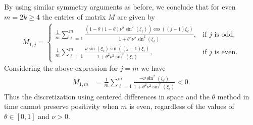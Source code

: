\documentclass[a4paper]{article}
\begin{document}
\begin{description}[style=unboxed,leftmargin=0cm]
\item [{Case 1:} $m$ is {even}.]
\item \noindent By using similar symmetry arguments as before, we conclude that for {even} $m=2k\ge 4$
the entries of matrix $M$ are given by
\begin{align*}
	M_{1,j} = \begin{cases}
				\displaystyle
				\frac{1}{m} \sum_{\ell=1}^{m}\frac{\left(1-\theta(1-\theta)\nu^2\sin^2(\xi_\ell)
					\right)\cos((j-1)\xi_\ell)}{1+\theta^2\nu^2\sin^2(\xi_\ell)}, &\mbox{if } j
					\text{ is odd}, \\[20pt]
				\displaystyle
				\frac{1}{m} \sum_{\ell=1}^{m} \frac{\nu \sin(\xi_\ell)\sin((j-1)\xi_\ell)}
					{1+\theta^2\nu^2 \sin^2 (\xi_\ell)}, &\mbox{if } j \text{ is even}.
			  \end{cases}
\end{align*}
Considering  the above expression for $j = m$ we have
\begin{align*}
    M_{1,m} & =  \frac{1}{m} \sum_{\ell=1}^{m} \frac{- \nu \sin^2 (\xi_\ell)}{1+\theta^2\nu^2 \sin^2 (\xi_\ell)} < 0.
\end{align*}
Thus the discretization using centered differences in space and the $\theta$
method in time cannot preserve positivity when $m$ is even, regardless of the
values of $\theta\in[0,1]$ and $\nu>0$.


\end{description}
\end{document}
